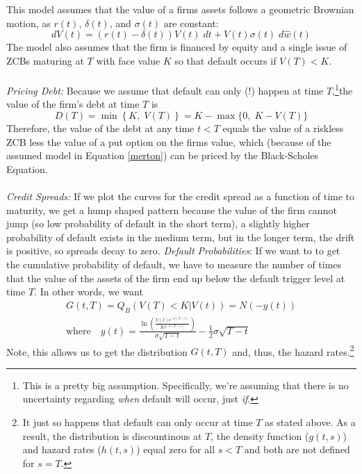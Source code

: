 \documentclass[a4paper,12pt]{scrartcl}
\begin{document}
This model assumes that the value of a firms assets follows a 
geometric Brownian motion, as $r(t)$, $\delta(t)$, and 
$\sigma(t)$ are constant:
\begin{equation}
   \label{merton}
   dV(t) = (r(t) - \delta(t)) V(t) \; dt + V(t) \sigma(t) \; d\hat{w}(t)
\end{equation}
The model also assumes that the firm is financed by equity and
a single issue of ZCBs maturing at $T$ with face value $K$ so that
default occurs if $V(T) < K$.
\\
\\
{\sl Pricing Debt:} Because we assume that default can only (!) happen
at time $T$,\footnote{This is a pretty big assumption. Specifically,
we're assuming that there is no uncertainty regarding \emph{when} 
default will occur, just \emph{if}.}the value of the firm's debt at 
time $T$ is
\[ D(T) = \min \left\{ K, \; V(T)\right\} = K - \max \{ 0, \; K-V(T)\}
      \]
Therefore, the value of the debt at any time $t<T$ equals the value
of a riskless ZCB less the value of a put option on the firms value, 
which (because of the assumed model in Equation \ref{merton}) can
be priced by the Black-Scholes Equation.
\\
\\
{\sl Credit Spreads:} If we plot the curves for the credit spread
as a function of time to maturity, we get a hump shaped pattern
because the value of the firm cannot jump (so low probability of
default in the short term), a slightly higher probability of default
exists in the medium term, but in the longer term, the drift is 
positive, so spreads decay to zero.
\newpage
{\sl Default Probabilities}: If we want to to get the cumulative
probability of default, we have to measure the number of times 
that the value of the assets of the firm end up below the default
trigger level at time $T$. In other words, we want
\begin{align*}
   G(t,T) = Q_B(V(T) < K |V(t)) = N(-y(t)) \\
   \text{where} \quad y(t) = \frac{\ln\left(\frac{V(t)e^{-\delta(T-t)}}{
      K e^{-r(T-t)}}\right)}{\sigma\sqrt{T-t}} - \frac{1}{2}
      \sigma \sqrt{T-t} 
\end{align*}
Note, this allows us to get the distribution $G(t,T)$ and, thus,
the hazard rates.\footnote{It just so happens that default can only
occur at time $T$ as stated above. As a result, the distribution
is discountinous at $T$, the density function ($g(t,s)$) 
and hazard rates ($h(t,s)$) equal zero for all $s < T$ and both are
not defined for $s=T$.}
\end{document}
